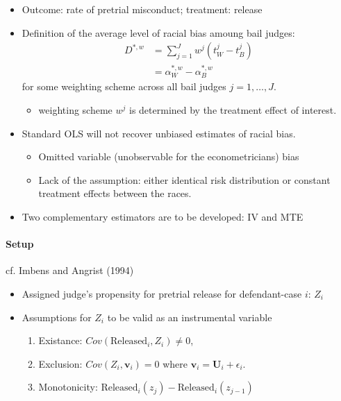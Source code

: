 \documentclass[../root]{subfiles}
\begin{document}
    \begin{itemize}
      \item Outcome: rate of pretrial misconduct; treatment: release
      \item Definition of the average level of racial bias amoung bail judges:
      \begin{align*}
        D^{*, w} &= \sum_{j = 1}^J w^j \left( t_W^j - t_B^j \right) \\
        &= \alpha_W^{*, w} - \alpha_B^{*, w}
      \end{align*}
      for some weighting scheme across all bail judges $j = 1, \ldots, J$.
      \begin{itemize}
        \item weighting scheme $w^j$ is determined by the treatment effect of interest.
      \end{itemize}
      \item Standard OLS will not recover unbiased estimates of racial bias.
      \begin{itemize}
        \item Omitted variable (unobservable for the econometricians) bias
        \item Lack of the assumption: either identical risk distribution or constant treatment effects between the races.
      \end{itemize}
      \item Two complementary estimators are to be developed: IV and MTE
    \end{itemize}

    \paragraph{Setup} cf. Imbens and Angrist (1994)

    \begin{itemize}
      \item Assigned judge's propensity for pretrial release for defendant-case $i$: $Z_i$
      \item Assumptions for $Z_i$ to be valid as an instrumental variable
      \begin{enumerate}
        \item Existance: $\textit{Cov}(\text{Released}_i, Z_i) \neq 0$,
        \item Exclusion: $\textit{Cov}(Z_i, \mathbf{v}_i) = 0$ where $\mathbf{v}_i = \mathbf{U}_i + \epsilon_i$.
        \item Monotonicity: $\text{Released}_i (z_j) - \text{Released}_i (z_{j - 1})$
      \end{enumerate}
    \end{itemize}
\end{document}

